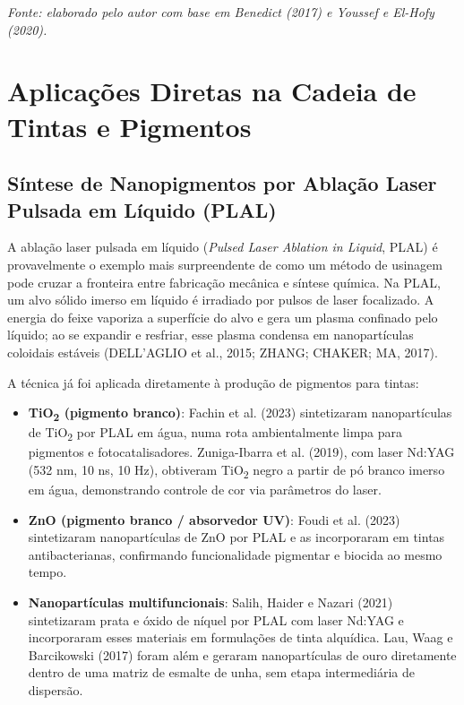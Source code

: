 \documentclass[
  12pt,
  a4paper,
  oneside,
  brazil,
  chapter=TITLE
]{article}
\newcommand{\secbreak}{\clearpage}
\let\oldsection\section
\renewcommand{\section}{\secbreak\oldsection}
\newcommand{\quadrofonte}[1]{\par\noindent\textit{Fonte: #1}\vspace{1em}\par}
\begin{document}
\quadrofonte{elaborado pelo autor com base em Benedict (2017) e Youssef e El-Hofy (2020).}

\section{Aplicações Diretas na Cadeia de Tintas e Pigmentos}\label{aplicacoes-diretas}

\subsection{Síntese de Nanopigmentos por Ablação Laser Pulsada em Líquido (PLAL)}\label{plal}

A ablação laser pulsada em líquido (\textit{Pulsed Laser Ablation in Liquid}, PLAL) é provavelmente o exemplo mais surpreendente de como um método de usinagem pode cruzar a fronteira entre fabricação mecânica e síntese química. Na PLAL, um alvo sólido imerso em líquido é irradiado por pulsos de laser focalizado. A energia do feixe vaporiza a superfície do alvo e gera um plasma confinado pelo líquido; ao se expandir e resfriar, esse plasma condensa em nanopartículas coloidais estáveis (DELL'AGLIO et al., 2015; ZHANG; CHAKER; MA, 2017).

A técnica já foi aplicada diretamente à produção de pigmentos para tintas:

\begin{itemize}
\tightlist
\item \textbf{TiO\textsubscript{2} (pigmento branco)}: Fachin et al. (2023) sintetizaram nanopartículas de TiO\textsubscript{2} por PLAL em água, numa rota ambientalmente limpa para pigmentos e fotocatalisadores. Zuniga-Ibarra et al. (2019), com laser Nd:YAG (532 nm, 10 ns, 10 Hz), obtiveram TiO\textsubscript{2} negro a partir de pó branco imerso em água, demonstrando controle de cor via parâmetros do laser.

\item \textbf{ZnO (pigmento branco / absorvedor UV)}: Foudi et al. (2023) sintetizaram nanopartículas de ZnO por PLAL e as incorporaram em tintas antibacterianas, confirmando funcionalidade pigmentar e biocida ao mesmo tempo.

\item \textbf{Nanopartículas multifuncionais}: Salih, Haider e Nazari (2021) sintetizaram prata e óxido de níquel por PLAL com laser Nd:YAG e incorporaram esses materiais em formulações de tinta alquídica. Lau, Waag e Barcikowski (2017) foram além e geraram nanopartículas de ouro diretamente dentro de uma matriz de esmalte de unha, sem etapa intermediária de dispersão.
\end{itemize}
\end{document}
